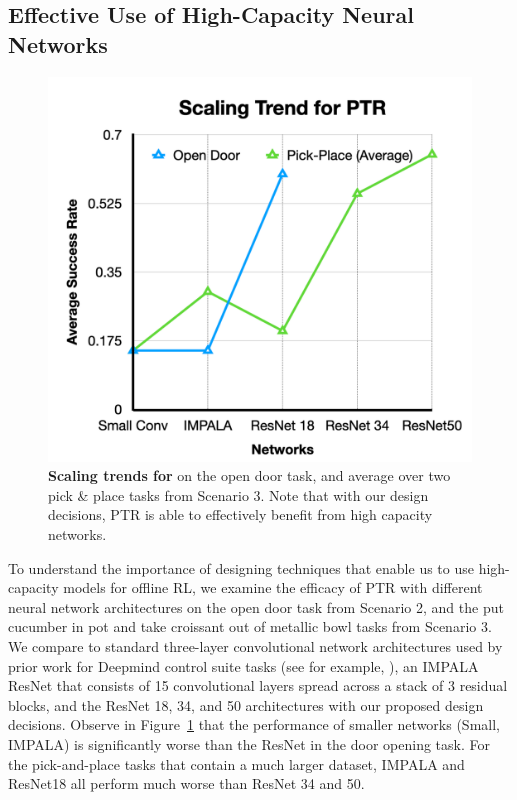 \vspace{-0.2cm}
\subsection{Effective Use of High-Capacity Neural Networks}
\vspace{-0.2cm}

\begin{figure}
\centering
\vspace{-0.5cm}
\includegraphics[width=0.98\linewidth]{chapters/ptr/scaling_ptr.pdf}
\vspace{-0.4cm}
\caption{\footnotesize{\label{fig:scaling_ptr} \textbf{Scaling trends for \ptrmethodname} on the open door task, and average over two pick \& place tasks from Scenario 3. Note that with our design decisions, PTR is able to effectively benefit from high capacity networks.}}
\vspace{-0.6cm}
\end{figure}
To understand the importance of designing techniques that enable us to use high-capacity models for offline RL, we examine the efficacy of PTR with different neural network architectures on the open door task from Scenario 2, and the put cucumber in pot and take croissant out of metallic bowl tasks from Scenario 3. We compare to standard three-layer convolutional network architectures used by prior work for Deepmind control suite tasks (see for example, \citet{kostrikov2020image}), an IMPALA~\citep{espeholt2018impala} ResNet that consists of 15 convolutional layers spread across a stack of 3 residual blocks, and the ResNet 18, 34, and 50 architectures with our proposed design decisions. Observe in Figure~\ref{fig:scaling_ptr} that the performance of smaller networks (Small, IMPALA) is significantly worse than the ResNet in the door opening task. For the pick-and-place tasks that contain a much larger dataset, IMPALA and ResNet18 all perform much worse than ResNet 34 and 50. 


